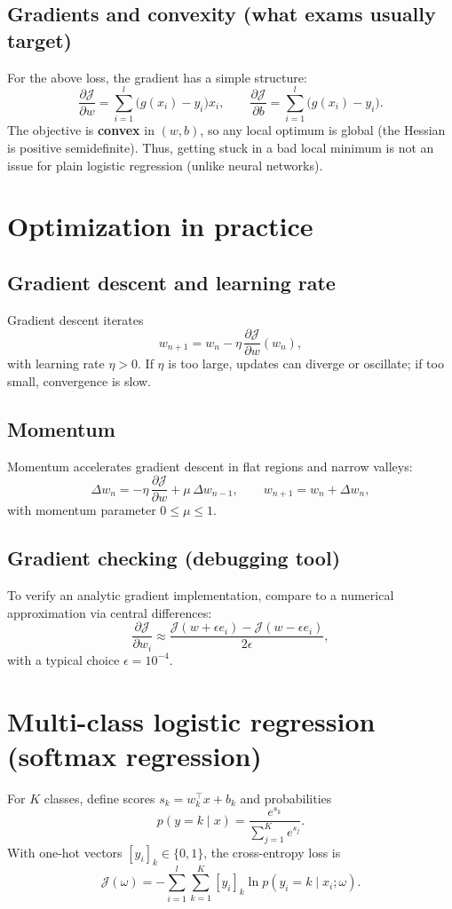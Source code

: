 \documentclass[11pt, oneside]{book}
\newcommand{\1}{\ind}                       %
\begin{document}
\subsection{Gradients and convexity (what exams usually target)}
For the above loss, the gradient has a simple structure:
\[
\frac{\partial \mathcal{J}}{\partial w}=\sum_{i=1}^{l}\big(g(x_i)-y_i\big)x_i,
\qquad
\frac{\partial \mathcal{J}}{\partial b}=\sum_{i=1}^{l}\big(g(x_i)-y_i\big).
\]
The objective is \textbf{convex} in $(w,b)$, so any local optimum is global (the Hessian is positive semidefinite). Thus, getting stuck in a bad local minimum is not an issue for plain logistic regression (unlike neural networks).

\section{Optimization in practice}
\subsection{Gradient descent and learning rate}
Gradient descent iterates
\[
  w_{n+1}=w_n-\eta\,\frac{\partial \mathcal{J}}{\partial w}(w_n),
\]
with learning rate $\eta>0$.
If $\eta$ is too large, updates can diverge or oscillate; if too small, convergence is slow.

\subsection{Momentum}
Momentum accelerates gradient descent in flat regions and narrow valleys:
\[
\Delta w_n = -\eta\,\frac{\partial \mathcal{J}}{\partial w}+\mu\,\Delta w_{n-1},
\qquad
w_{n+1}=w_n+\Delta w_n,
\]
with momentum parameter $0\le \mu\le 1$.

\subsection{Gradient checking (debugging tool)}
To verify an analytic gradient implementation, compare to a numerical approximation via central differences:
\[
\frac{\partial \mathcal{J}}{\partial w_i}
\approx
\frac{\mathcal{J}(w+\epsilon e_i)-\mathcal{J}(w-\epsilon e_i)}{2\epsilon},
\]
with a typical choice $\epsilon=10^{-4}$.

\section{Multi-class logistic regression (softmax regression)}
For $K$ classes, define scores $s_k=w_k^\top x+b_k$ and probabilities
\[
p(y=k\mid x)=\frac{e^{s_k}}{\sum_{j=1}^{K}e^{s_j}}.
\]
With one-hot vectors $[y_i]_k\in\{0,1\}$, the cross-entropy loss is
\[
\mathcal{J}(\omega)
=
-\sum_{i=1}^{l}\sum_{k=1}^{K}[y_i]_k\ln p(y_i=k\mid x_i;\omega).
\]
\end{document}
